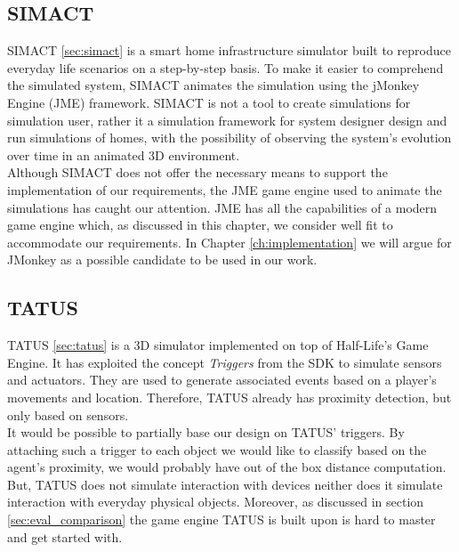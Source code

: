 \subsection{SIMACT}\label{subsec:design_simact}
SIMACT \ref{sec:simact} is a smart home infrastructure simulator built to reproduce everyday life scenarios on a step-by-step basis. To make it easier to comprehend the simulated system, SIMACT animates the simulation using the jMonkey Engine (JME) framework. SIMACT is not a tool to create simulations for simulation user, rather it a simulation framework for system designer design and run simulations of homes, with the possibility of observing the system's evolution over time in an animated 3D environment.\\

Although SIMACT does not offer the necessary means to support the implementation of our requirements, the JME game engine used to animate the simulations has caught our attention. JME has all the capabilities of a modern game engine which, as discussed in this chapter, we consider well fit to accommodate our requirements. In Chapter \ref{ch:implementation} we will argue for JMonkey as a possible candidate to be used in our work.\\

\subsection{TATUS}\label{subsec:design_tatus}
TATUS \ref{sec:tatus} is a 3D simulator implemented on top of Half-Life's Game Engine. It has exploited the concept \emph{Triggers} from the SDK to simulate sensors and actuators. They are used to generate associated events based on a player's movements and location. Therefore, TATUS already has proximity detection, but only based on sensors.\\

It would be possible to partially base our design on TATUS' triggers. By attaching such a trigger to each object we would like to classify based on the agent's proximity, we would probably have out of the box distance computation. But, TATUS does not simulate interaction with devices neither does it simulate interaction with everyday physical objects. Moreover, as discussed in section \ref{sec:eval_comparison} the game engine TATUS is built upon is hard to master and get started with.\\

